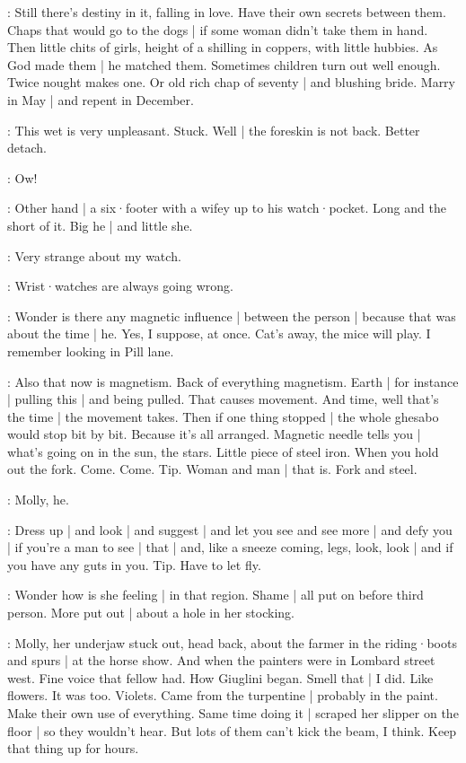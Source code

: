\BloomAbstract:
Still there's destiny in it,
falling in love.
Have their own secrets between them.
Chaps that would go to the dogs |
if some woman didn't take them in hand.
Then little chits of girls,
height of a shilling in coppers,
with little hubbies.
As God made them |
he matched them.
Sometimes children turn out well enough.
Twice nought makes one.
Or old rich chap of seventy |
and blushing bride.
Marry in May |
and repent in December.

\BloomCurrent:
This wet is very unpleasant.
Stuck.
Well |
the foreskin is not back.
Better detach.%

\BloomInt:
Ow!

\BloomAbstract:
Other hand |
a six·footer with a wifey up to his watch·pocket.
Long and the short of it.
Big he |
and little she.

\BloomToday:
Very strange about my watch.

\BloomAbstract:
Wrist·watches are always going wrong.

\BloomToday:
Wonder is there any magnetic influence |
between the person |
because that was about the time |
he.
Yes,
I suppose,
at once.
Cat's away,
the mice will play.
I remember looking in Pill lane.

\BloomAbstract:
Also that now is magnetism.
Back of everything magnetism.
Earth |
for instance |
pulling this |
and being pulled.
That causes movement.
And time,
well that's the time |
the movement takes.
Then if one thing stopped |
the whole ghesabo would stop bit by bit.%
Because it's all arranged.
Magnetic needle tells you |
what's going on in the sun,
the stars.
Little piece of steel iron.
When you hold out the fork.
Come.
Come.
Tip.
Woman and man |
that is.
Fork and steel.

\BloomToday:
Molly,
he.

\BloomAbstract:
Dress up |
and look |
and suggest |
and let you see and see more |
and defy you |
if you're a man to see |
that |
and,
like a sneeze coming,
legs,
look,
look |
and if you have any guts in you.
Tip.
Have to let fly.

\BloomCurrent:
Wonder how is she feeling |
in that region.
Shame |
all put on before third person.
More put out |
about a hole in her stocking.

\BloomHist:
Molly,
her underjaw stuck out,
head back,
about the farmer in the riding·boots and spurs |
at the horse show.%
And when the painters were in Lombard street west.
Fine voice that fellow had.
How Giuglini began.
Smell that |
I did.
Like flowers.
It was too.
Violets.
Came from the turpentine |
probably in the paint.
Make their own use of everything.
Same time doing it |
scraped her slipper on the floor |
so they wouldn't hear.
But lots of them can't kick the beam,
I think.
Keep that thing up for hours.

